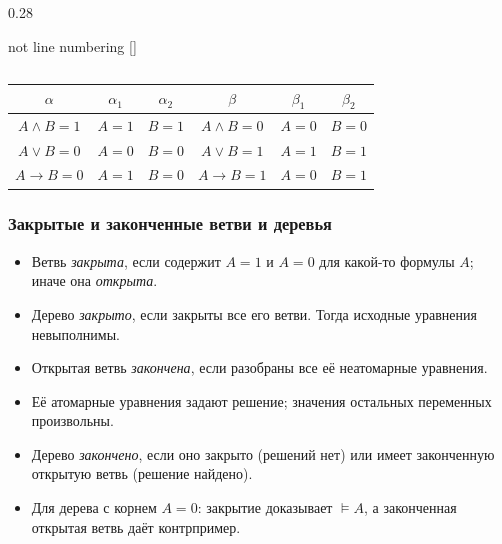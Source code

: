 \begin{frame}
\begin{itemize}
\begin{columns}
\begin{column}{0.28\textwidth}
        \begin{center}
            \begin{tableau}{not line numbering}
                [\beta [\beta_1] [\beta_2]]
            \end{tableau}
        \end{center}
    \end{column}
\end{columns}
    \vspace{1em}
    \begin{tabular}{|c | c | c || c | c | c |}
        \hline
        $\alpha$ & $\alpha_1$ & $\alpha_2$ & $\beta$ & $\beta_1$ & $\beta_2$ \\
        \hline
        $A \land B = 1$ & $A = 1$ & $B = 1$ & $A \land B = 0$ & $A = 0$ & $B = 0$ \\
        $A \lor B = 0$ & $A = 0$ & $B = 0$ & $A \lor B = 1$ & $A = 1$ & $B = 1$ \\
        $A \to B = 0$ & $A = 1$ & $B = 0$ & $A \to B = 1$ & $A = 0$ & $B = 1$ \\
        \hline
    \end{tabular}
\end{itemize}
\end{frame}

\begin{frame}
\frametitle{Закрытые и законченные ветви и деревья}
\begin{itemize}
    \item Ветвь \emph{закрыта}, если содержит $A=1$ и $A=0$ для какой-то формулы $A$; иначе она \emph{открыта}.
    \item Дерево \emph{закрыто}, если закрыты все его ветви. Тогда исходные уравнения невыполнимы.
    \pause
    \item Открытая ветвь \emph{закончена}, если разобраны все её неатомарные уравнения.
    \item Её атомарные уравнения задают решение; значения остальных переменных произвольны.
    \pause
    \item Дерево \emph{закончено}, если оно закрыто (решений нет) или имеет законченную открытую ветвь (решение найдено).
    \item Для дерева с корнем $A=0$: закрытие доказывает $\vDash A$, а законченная открытая ветвь даёт контрпример.
\end{itemize}
\end{frame}


